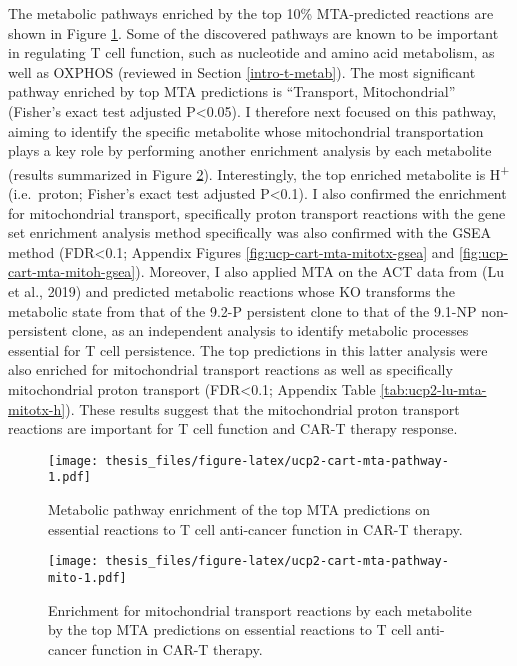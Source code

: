 \documentclass[12pt,twoside,openany,\mydriver]{thesis}  %
\begin{document}
The metabolic pathways enriched by the top 10\% MTA-predicted reactions are shown in Figure \ref{fig:ucp2-cart-mta-pathway}. Some of the discovered pathways are known to be important in regulating T cell function, such as nucleotide and amino acid metabolism, as well as OXPHOS (reviewed in Section \ref{intro-t-metab}). The most significant pathway enriched by top MTA predictions is ``Transport, Mitochondrial'' (Fisher's exact test adjusted P\textless{}0.05). I therefore next focused on this pathway, aiming to identify the specific metabolite whose mitochondrial transportation plays a key role by performing another enrichment analysis by each metabolite (results summarized in Figure \ref{fig:ucp2-cart-mta-pathway-mito}). Interestingly, the top enriched metabolite is H\textsuperscript{+} (i.e.~proton; Fisher's exact test adjusted P\textless{}0.1). I also confirmed the enrichment for mitochondrial transport, specifically proton transport reactions with the gene set enrichment analysis method specifically was also confirmed with the GSEA method (FDR\textless{}0.1; Appendix Figures \ref{fig:ucp-cart-mta-mitotx-gsea} and \ref{fig:ucp-cart-mta-mitoh-gsea}). Moreover, I also applied MTA on the ACT data from (Lu et al., 2019) and predicted metabolic reactions whose KO transforms the metabolic state from that of the 9.2-P persistent clone to that of the 9.1-NP non-persistent clone, as an independent analysis to identify metabolic processes essential for T cell persistence. The top predictions in this latter analysis were also enriched for mitochondrial transport reactions as well as specifically mitochondrial proton transport (FDR\textless{}0.1; Appendix Table \ref{tab:ucp2-lu-mta-mitotx-h}). These results suggest that the mitochondrial proton transport reactions are important for T cell function and CAR-T therapy response.
\begin{figure}
\centering
\texttt{[image: thesis\_files/figure-latex/ucp2-cart-mta-pathway-1.pdf]}
\caption{\label{fig:ucp2-cart-mta-pathway}Metabolic pathway enrichment of the top MTA predictions on essential reactions to T cell anti-cancer function in CAR-T therapy.}
\end{figure}
\begin{figure}
\centering
\texttt{[image: thesis\_files/figure-latex/ucp2-cart-mta-pathway-mito-1.pdf]}
\caption{\label{fig:ucp2-cart-mta-pathway-mito}Enrichment for mitochondrial transport reactions by each metabolite by the top MTA predictions on essential reactions to T cell anti-cancer function in CAR-T therapy.}
\end{figure}
\end{document}
